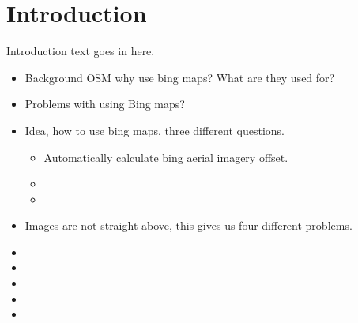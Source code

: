 \newpage
\section{Introduction}
Introduction text goes in here.

\begin{itemize}
    \item Background OSM why use bing maps? What are they used for?
    \item Problems with using Bing maps?
    \item Idea, how to use bing maps, three different questions.
        \begin{itemize}
            \item Automatically calculate bing aerial imagery offset.
            \item 
            \item
        \end{itemize}
    \item Images are not straight above, this gives us four different problems.
    \item
    \item
    \item
    \item
    \item
\end{itemize}

